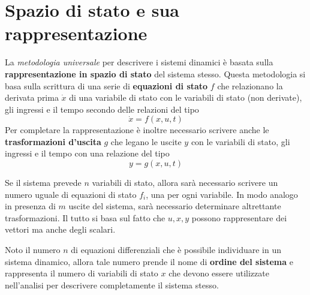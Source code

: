 \section{Spazio di stato e sua rappresentazione}
	\begin{concetto}
		La \textit{metodologia universale} per descrivere i sistemi dinamici è basata sulla \textbf{rappresentazione in spazio di stato} del sistema stesso. Questa metodologia si basa sulla scrittura di una serie di \textbf{equazioni di stato} $f$ che relazionano la derivata prima $\dot x$ di una variabile di stato con le variabili di stato (non derivate), gli ingressi e il tempo secondo delle relazioni del tipo
		\[ \dot x = f( x,u,t)\]
		Per completare la rappresentazione è inoltre necessario scrivere anche le \textbf{trasformazioni d'uscita} $g$ che legano le uscite $y$ con le variabili di stato, gli ingressi e il tempo con una relazione del tipo
		\[ y = g(x,u,t)  \]
	\end{concetto}
	\begin{osservazione}
		Se il sistema prevede $n$ variabili di stato, allora sarà necessario scrivere un numero uguale di equazioni di stato $f_i$, una per ogni variabile. In modo analogo in presenza di $m$ uscite del sistema, sarà necessario determinare altrettante trasformazioni. Il tutto si basa sul fatto che $u,x,y$ possono rappresentare dei vettori ma anche degli scalari.
	\end{osservazione}
	Noto il numero $n$ di equazioni differenziali che è possibile individuare in un sistema dinamico, allora tale numero prende il nome di \textbf{ordine del sistema} e rappresenta il numero di variabili di stato $x$ che devono essere utilizzate nell'analisi per descrivere completamente il sistema stesso.
	
